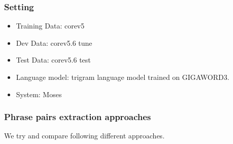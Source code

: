 \documentclass[11pt, letterpaper]{article}   	%
\begin{document}
\subsubsection{Setting}
\begin{itemize}
\item Training Data: corev5
\item Dev Data: corev5.6 tune
\item Test Data: corev5.6 test
\item Language model: trigram language model trained on GIGAWORD3.
\item System: Moses \cite{moses-07}
\end{itemize}

\subsubsection{Phrase pairs extraction approaches}
We try and compare following different approaches.
\end{document}
